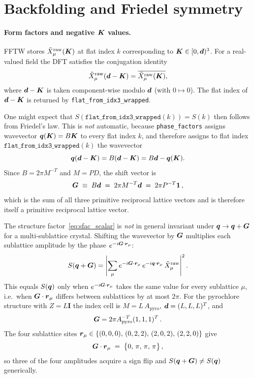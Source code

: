 \documentclass[12pt,a4paper]{article}
\newcommand\bs[1]{\ensuremath\boldsymbol{#1}}
\def\raw{\mathrm{raw}}
\begin{document}
\section{Backfolding and Friedel symmetry}

\paragraph{Form factors and negative $\bs{K}$ values.}
FFTW stores $\tilde{X}^{\raw}_\mu(\bs{K})$ at flat index $k$ corresponding to
$\bs{K}\in[0,\bs{d})^3$.  For a real-valued field the DFT satisfies the
conjugation identity
\begin{equation}
    \tilde{X}^{\raw}_\mu(\bs{d}-\bs{K}) = \overline{\tilde{X}^{\raw}_\mu(\bs{K})},
    \label{eq:conj}
\end{equation}
where $\bs{d}-\bs{K}$ is taken component-wise modulo $\bs{d}$ (with $0\mapsto 0$).
The flat index of $\bs{d}-\bs{K}$ is returned by \texttt{flat\_from\_idx3\_wrapped}.

One might expect that $S(\texttt{flat\_from\_idx3\_wrapped}(k)) = S(k)$ then follows from
Friedel's law.  This is \emph{not} automatic, because \texttt{phase\_factors}
assigns wavevector $\bs{q}(\bs{K})=B\bs{K}$ to every flat index $k$, and
therefore assigns to flat index $\texttt{flat\_from\_idx3\_wrapped}(k)$ the wavevector
\begin{equation}
    \bs{q}(\bs{d}-\bs{K}) = B(\bs{d}-\bs{K}) = B\bs{d} - \bs{q}(\bs{K}).
    \label{eq:neg_k_shift}
\end{equation}
Since $B = 2\pi M^{-T}$ and $M = PD$, the shift vector is
\begin{equation}
    \bs{G} \;\equiv\; B\bs{d} \;=\; 2\pi M^{-T}\bs{d} \;=\; 2\pi P^{-T}\bs{1}\,,
    \label{eq:Gshift}
\end{equation}
which is the sum of all three primitive reciprocal lattice vectors and is
therefore itself a primitive reciprocal lattice vector.

The structure factor~\eqref{eq:sfac_scalar} is \emph{not} in general invariant
under $\bs{q}\to\bs{q}+\bs{G}$ for a multi-sublattice crystal.
Shifting the wavevector by $\bs{G}$ multiplies each sublattice amplitude by
the phase $e^{-i\bs{G}\cdot\bs{r}_\mu}$:
\begin{equation}
    S(\bs{q}+\bs{G})
    = \left|\sum_\mu e^{-i\bs{G}\cdot\bs{r}_\mu}\,
             e^{-i\bs{q}\cdot\bs{r}_\mu}\,\tilde{X}^{\raw}_\mu\right|^2.
    \label{eq:Gshift_S}
\end{equation}
This equals $S(\bs{q})$ only when $e^{-i\bs{G}\cdot\bs{r}_\mu}$ takes the
same value for every sublattice $\mu$, i.e.\ when $\bs{G}\cdot\bs{r}_\mu$
differs between sublattices by at most $2\pi$.  For the pyrochlore structure
with $Z=L\mathbf{I}$ the index cell is $M=L\,A_{\mathrm{pyro}}$,
$\bs{d}=(L,L,L)^T$, and
\[
    \bs{G} = 2\pi A_{\mathrm{pyro}}^{-T}(1,1,1)^T\,.
\]
The four sublattice sites $\bs{r}_\mu \in \{(0,0,0),\,(0,2,2),\,(2,0,2),\,(2,2,0)\}$ give
\[
    \bs{G}\cdot\bs{r}_\mu \;=\; \bigl\{0,\,\pi,\,\pi,\,\pi\bigr\}\,,
\]
so three of the four amplitudes acquire a sign flip and
$S(\bs{q}+\bs{G})\neq S(\bs{q})$ generically.
\end{document}
